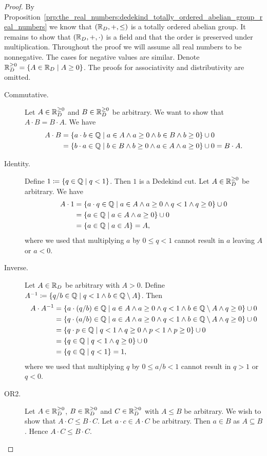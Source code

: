 \documentclass[../main.tex]{subfiles}
\begin{document}
\begin{proof}
    By Proposition~\ref{prp:the_real_numbers:dedekind_totally_ordered_abelian_group_real_numbers} we know that $(\mathbb{R}_D,+,\leq)$ is a totally ordered abelian group. It remains to show that $(\mathbb{R}_D,+,\cdot)$ is a field and that the order is preserved under multiplication. Throughout the proof we will assume all real numbers to be nonnegative. The cases for negative values are similar. Denote $\mathbb{R}_D^{\geq0}=\{A\in\mathbb{R}_D\mid A\geq0\}$. The proofs for associativity and distributivity are omitted.
    \begin{description}
        \item[Commutative.] Let $A\in\mathbb{R}_D^{\geq0}$ and $B\in\mathbb{R}_D^{\geq0}$ be arbitrary. We want to show that $A\cdot B=B\cdot A$. We have
        \begin{align*}
            A\cdot B & =\{a\cdot b\in\mathbb{Q}\mid a\in A\land a\geq0\land b\in B\land b\geq0\}\cup0 \\
            & =\{b\cdot a\in\mathbb{Q}\mid b\in B\land b\geq0\land a\in A\land a\geq0\}\cup0=B\cdot A.
        \end{align*}
        \item[Identity.] Define $1\coloneq\{q\in\mathbb{Q}\mid q<1\}$. Then $1$ is a Dedekind cut. Let $A\in\mathbb{R}_D^{\geq0}$ be arbitrary. We have
        \begin{align*}
            A\cdot1 & =\{a\cdot q\in\mathbb{Q}\mid a\in A\land a\geq0\land q<1\land q\geq0\}\cup0 \\
            & =\{a\in\mathbb{Q}\mid a\in A\land a\geq0\}\cup0 \\
            & =\{a\in\mathbb{Q}\mid a\in A\}=A,
        \end{align*}
        where we used that multiplying $a$ by $0\leq q<1$ cannot result in $a$ leaving $A$ or $a<0$.
        \item[Inverse.] Let $A\in\mathbb{R}_D$ be arbitrary with $A>0$. Define $A^{-1}\coloneq\{q/b\in\mathbb{Q}\mid q<1\land b\in\mathbb{Q}\setminus A\}$. Then
        \begin{align*}
            A\cdot A^{-1} & =\{a\cdot(q/b)\in\mathbb{Q}\mid a\in A\land a\geq0\land q<1\land b\in\mathbb{Q}\setminus A\land q\geq0\}\cup0 \\
            & =\{q\cdot(a/b)\in\mathbb{Q}\mid a\in A\land a\geq0\land q<1\land b\in\mathbb{Q}\setminus A\land q\geq0\}\cup0 \\
            & =\{q\cdot p\in\mathbb{Q}\mid q<1\land q\geq0\land p<1\land p\geq0\}\cup0 \\
            & =\{q\in\mathbb{Q}\mid q<1\land q\geq0\}\cup0 \\
            & =\{q\in\mathbb{Q}\mid q<1\}=1,
        \end{align*}
        where we used that multiplying $q$ by $0\leq a/b<1$ cannot result in $q>1$ or $q<0$.
        \item[OR2.] Let $A\in\mathbb{R}_D^{\geq0}$, $B\in\mathbb{R}_D^{\geq0}$ and $C\in\mathbb{R}_D^{\geq0}$ with $A\leq B$ be arbitrary. We wish to show that $A\cdot C\leq B\cdot C$. Let $a\cdot c\in A\cdot C$ be arbitrary. Then $a\in B$ as $A\subseteq B$. Hence $A\cdot C\leq B\cdot C$.
    \end{description}
\end{proof}
\end{document}
